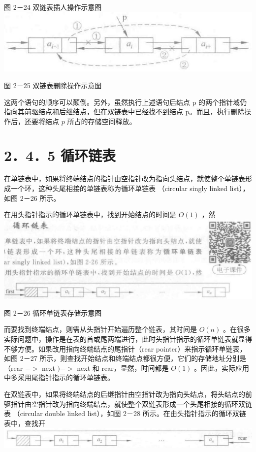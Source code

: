 \documentclass[10pt]{article}
\begin{document}
图 2－24 双链表插人操作示意图\\
\includegraphics[max width=\textwidth, center]{2025_06_06_704745ea57b15b2333e5g-063}

图 2－25 双链表删除操作示意图

这两个语句的顺序可以颠倒。另外，虽然执行上述语句后结点 p 的两个指针域仍指向其前驱结点和后继结点，但在双链表中已经找不到结点 p。而且，执行删除操作后，还要将结点 $p$ 所占的存储空间释放。

\section*{2．4．5 循环链表}
在单链表中，如果将终端结点的指针由空指针改为指向头结点，就使整个单链表形成一个环，这种头尾相接的单链表称为循环单链表 （circular singly linked list），如图 2－26 所示。

在用头指针指示的循环单链表中，找到开始结点的时间是 $O(1)$ ，然\\
\includegraphics[max width=\textwidth, center]{2025_06_06_704745ea57b15b2333e5g-063(2)}

图 2－26 循环单链表存储示意图

而要找到终端结点，则需从头指针开始遍历整个链表，其时间是 $O(n)$ 。在很多实际问题中，操作是在表的首或尾两端进行，此时头指针指示的循环单链表就显得不够方便。如果改用指向终端结点的尾指针（rear pointer）来指示循环单链表，如图 2－27 所示，则查找开始结点和终端结点都很方便，它们的存储地址分别是（rear $->$ next $)->$ next 和 rear，显然，时间都是 $O(1)$ 。因此，实际应用中多采用尾指针指示的循环单链表。

在双链表中，如果将终端结点的后继指针由空指针改为指向头结点，将头结点的前驱指针由空指针改为指向终端结点，就使整个双链表形成一个头尾相接的循环双链表 （circular double linked list），如图 2－28 所示。在由头指针指示的循环双链表中，查找开\\
\includegraphics[max width=\textwidth, center]{2025_06_06_704745ea57b15b2333e5g-064(2)}
\end{document}
